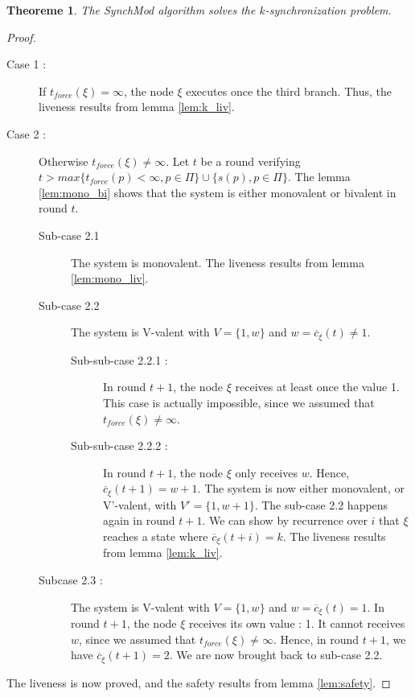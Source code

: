 \documentclass{article}
\newtheorem{theorem}{Theoreme}
\begin{document}
\begin{theorem}
	The SynchMod algorithm solves the $k$-synchronization problem.
\end{theorem}
\begin{proof}
	\begin{description}
		\item[Case 1 : ] If $t_{force}(\xi) = \infty$, the node $\xi$ executes once the third branch.
			Thus, the liveness results from lemma \ref{lem:k_liv}.

		\item[Case 2 :] Otherwise $t_{force}(\xi) \neq \infty$.
			Let $t$ be a round verifying $t > max \{t_{force}(p) < \infty, p \in \Pi\} \cup \{s(p), p \in \Pi\}$.
			The lemma \ref{lem:mono_bi} shows that the system is either monovalent or bivalent in round $t$.
			\begin{description}
				\item[Sub-case 2.1] The system is monovalent. The liveness results from lemma \ref{lem:mono_liv}.
				\item[Sub-case 2.2] The system is V-valent with $V = \{1, w\}$ and $w = \overline{c}_\xi(t) \neq 1$.
					\begin{description}
						\item[Sub-sub-case 2.2.1 : ] In round $t+1$, the node $\xi$ receives at least once
							the value 1.
							This case is actually impossible, since we assumed that $t_{force}(\xi) \neq \infty$.
						\item[Sub-sub-case 2.2.2 : ] In round $t+1$, the node $\xi$ only receives $w$.
							Hence, $\overline{c}_\xi(t+1) = w+1$. The system is now either monovalent,
							or V'-valent, with $V' = \{1, w+1\}$.
							The sub-case 2.2 happens again in round $t+1$.
							We can show by recurrence over $i$ that $\xi$ reaches a state where $\overline{c}_\xi(t+i) = k$.
							The liveness results from lemma \ref{lem:k_liv}.
					\end{description}
				\item[Subcase 2.3 : ] The system is V-valent with $V = \{1, w\}$ and $w = \overline{c}_\xi(t) = 1$.
					In round $t+1$, the node $\xi$ receives its own value : 1.
					It cannot receives $w$, since we assumed that $t_{force}(\xi) \neq \infty$.
					Hence, in round $t+1$, we have $\overline{c}_\xi(t+1) = 2$.
					We are now brought back to sub-case 2.2.
			\end{description}
	\end{description}
	The liveness is now proved, and the safety results from lemma \ref{lem:safety}.
\end{proof}
\end{document}
